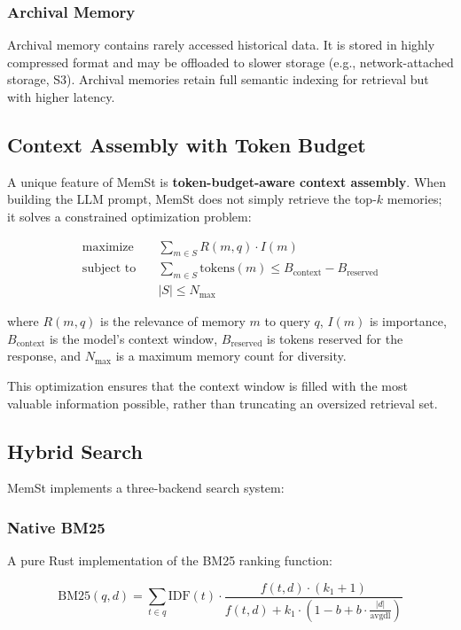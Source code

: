 \subsubsection{Archival Memory}

Archival memory contains rarely accessed historical data. It is stored in highly compressed format and may be offloaded to slower storage (e.g., network-attached storage, S3). Archival memories retain full semantic indexing for retrieval but with higher latency.

\subsection{Context Assembly with Token Budget}

A unique feature of MemSt is \textbf{token-budget-aware context assembly}. When building the LLM prompt, MemSt does not simply retrieve the top-$k$ memories; it solves a constrained optimization problem:

\begin{align}
\text{maximize} \quad & \sum_{m \in S} R(m, q) \cdot I(m) \\
\text{subject to} \quad & \sum_{m \in S} \text{tokens}(m) \leq B_{\text{context}} - B_{\text{reserved}} \\
& |S| \leq N_{\max}
\end{align}

where $R(m, q)$ is the relevance of memory $m$ to query $q$, $I(m)$ is importance, $B_{\text{context}}$ is the model's context window, $B_{\text{reserved}}$ is tokens reserved for the response, and $N_{\max}$ is a maximum memory count for diversity.

This optimization ensures that the context window is filled with the most valuable information possible, rather than truncating an oversized retrieval set.

\subsection{Hybrid Search}

MemSt implements a three-backend search system:

\subsubsection{Native BM25}

A pure Rust implementation of the BM25 ranking function:

\begin{equation}
\text{BM25}(q, d) = \sum_{t \in q} \text{IDF}(t) \cdot \frac{f(t, d) \cdot (k_1 + 1)}{f(t, d) + k_1 \cdot (1 - b + b \cdot \frac{|d|}{\text{avgdl}})}
\end{equation}

